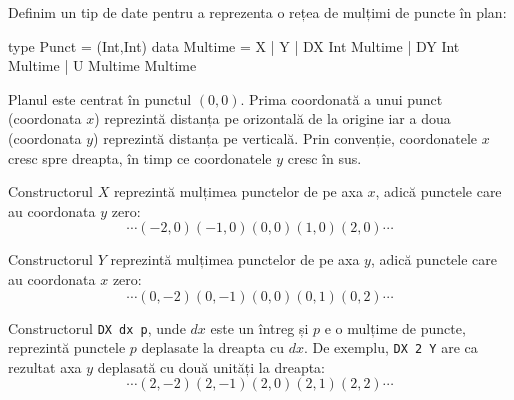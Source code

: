 \documentclass[addpoints,12pt,a4paper]{exam}
\begin{document}
\begin{questions}
\question[3]
Definim un tip de date pentru a reprezenta o rețea de mulțimi de puncte în plan:
\begin{asciihs}
  type Punct = (Int,Int)
  data Multime = X 
               | Y 
               | DX Int Multime 
               | DY Int Multime 
               | U Multime Multime
\end{asciihs}
Planul este centrat în punctul $(0,0)$.  Prima coordonată a unui punct (coordonata $x$) reprezintă distanța pe orizontală de la origine iar a doua (coordonata $y$) reprezintă distanța pe verticală.  Prin convenție, coordonatele $x$ cresc spre dreapta, în timp ce coordonatele $y$ cresc în sus.  

Constructorul $X$ reprezintă mulțimea punctelor de pe axa $x$, adică punctele care au coordonata $y$ zero:
$$\cdots (-2,0) (-1,0) (0,0) (1,0) (2,0) \cdots$$

Constructorul $Y$ reprezintă mulțimea punctelor de pe axa $y$, adică punctele care au coordonata $x$ zero:
$$\cdots (0,-2) (0,-1) (0,0) (0,1) (0,2) \cdots$$

Constructorul \lstinline$DX dx p$, unde $dx$ este un întreg și $p$ e o mulțime de puncte, reprezintă punctele $p$ deplasate la dreapta cu $dx$. De exemplu, \lstinline$DX 2 Y$ are ca rezultat axa $y$ deplasată cu două unități la dreapta:
$$\cdots (2,-2) (2,-1) (2,0) (2,1) (2,2) \cdots$$


\end{questions}
\end{document}
